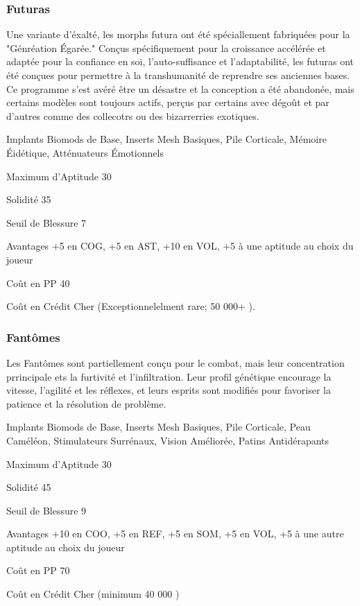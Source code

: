 \subsubsection{Futuras} \label{sec:starting-futuras} 

Une variante d'éxalté, les morphs futura ont été spéciallement fabriquées pour la "Génréation Égarée." Conçus spécifiquement pour la croissance accélérée et adaptée pour la confiance en soi, l'auto-suffisance et l'adaptabilité, les futuras ont été conçues pour permettre à la transhumanité de reprendre ses anciennes bases. Ce programme s'est avéré être un désastre et la conception a été abandonée, mais certains modèles sont toujours actifs, perçus par certains avec dégoût et par d'autres comme des collecotrs ou des bizarrerries exotiques. 

\begin{description*} \item[Implants] Biomods de Base, Inserts Mesh Basiques, Pile Corticale, Mémoire Éidétique, Atténuateurs Émotionnels\item[Maximum d'Aptitude] 30 \item[Solidité] 35 \item[Seuil de Blessure] 7 \item[Avantages] +5 en COG, +5 en AST, +10 en VOL, +5 à une aptitude au choix du joueur\item[Coût en PP] 40 \item[Coût en Crédit] Cher (Exceptionnelelment rare; 50 000+ ). \end{description*} 

\subsubsection{Fantômes} \label{sec:starting-ghosts} 

Les Fantômes sont partiellement conçu pour le combat, mais leur concentration prrincipale ets la furtivité et l'infiltration. Leur profil génétique encourage la vitesse, l'agilité et les réflexes, et leurs esprits sont modifiés pour favoriser la patience et la résolution de problème. 

\begin{description*} \item[Implants] Biomods de Base, Inserts Mesh Basiques, Pile Corticale, Peau Caméléon, Stimulateurs Surrénaux, Vision Améliorée, Patins Antidérapants\item[Maximum d'Aptitude] 30 \item [Solidité] 45 \item[Seuil de Blessure] 9 \item[Avantages] +10 en COO, +5 en REF, +5 en SOM, +5 en VOL, +5 à une autre aptitude au choix du joueur\item[Coût en PP] 70 \item[Coût en Crédit] Cher (minimum 40 000 ) \end{description*} 

